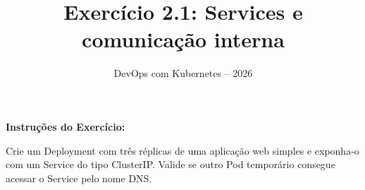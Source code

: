 \documentclass[11pt,a4paper]{article}
\title{\color{secondary}\Huge\textbf{Exercício 2.1: Services e comunicação interna}}
\author{\color{primary}DevOps com Kubernetes -- 2026}
\date{}
\begin{document}
\maketitle


\textbf{Instruções do Exercício:}

\begin{tcolorbox}[colback=blue!5!white,colframe=blue!75!black]
Crie um Deployment com três réplicas de uma aplicação web simples e exponha-o com um Service do tipo ClusterIP. Valide se outro Pod temporário consegue acessar o Service pelo nome DNS.
\end{tcolorbox}
\end{document}
